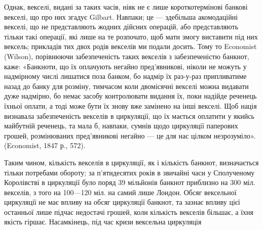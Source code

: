 Однак, векселі, видані за таких часів, ніяк не є лише короткотермінові
банкові векселі, що про них згадує Gilbart. Навпаки; це — здебільша акомодаційні
векселі, що не представляють жодних дійсних операцій, або представляють
тільки такі операції, які лише на те розпочато, щоб мати змогу виставити під них
вексель; прикладів тих двох родів векселів ми подали досить. Тому то Economist
(Wilson), порівнюючи забезпеченість таких векселів з забезпеченістю банкнот,
каже: «Банкноти, що їх оплачують негайно пред’явникові, ніколи не можуть у
надмірному числі лишатися поза банком, бо надмір їх раз-у-раз припливатиме
назад до банку для розміну, тимчасом коли двомісячні векселі можна видавати
дуже надмірно, бо немає засобу контролювати видання їх, поки надійде реченець
їхньої оплати, а тоді може бути їх знову вже замінено на інші векселі. Щоб
нація визнавала забезпеченість векселів в циркуляції, що їх мається оплатити
у якийсь майбутній реченець, та мала б, навпаки, сумнів щодо циркуляції
паперових грошей, розмінюваних пред’явникові негайно — це для нас цілком
незрозуміло». (Economist, 1847 р., 572).

Таким чином, кількість векселів в циркуляції, як і кількість банкнот, визначається
тільки потребами обороту; за п’ятидесятих років в звичайні часи у
Сполученому Королівстві в циркуляції було поряд 39 мільйонів банкнот приблизно
на 300 міл. векселів, з того на 100—120 міл. на самий лише Лондон. Обсяг
вексельної циркуляції не має впливу на обсяг циркуляції банкнот, та зазнає
впливу цієї останньої лише підчас недостачі грошей, коли кількість векселів
більшає, а їхня якість гіршає. Насамкінець, під час кризи вексельна циркуляція
